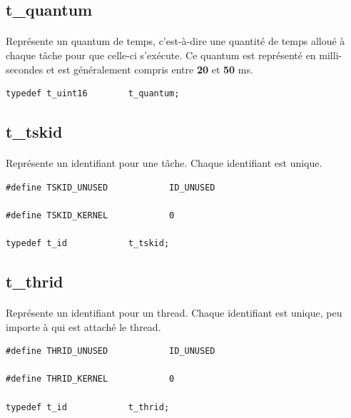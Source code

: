 \documentclass[10pt,a4wide]{article}
\begin{document}
\subsection{t\_quantum}

\paragraph{}

Repr\'esente un quantum de temps, c'est-\`a-dire une quantit\'e de temps
allou\'e \`a chaque t\^ache pour que celle-ci s'ex\'ecute. Ce quantum
est repr\'esent\'e en milli-secondes et est g\'en\'eralement compris
entre \textbf{20} et \textbf{50} ms.

\begin{verbatim}
typedef t_uint16        t_quantum;
\end{verbatim}

\subsection{t\_tskid}

\paragraph{}

Repr\'esente un identifiant pour une t\^ache. Chaque identifiant est
unique.

\begin{verbatim}
#define TSKID_UNUSED            ID_UNUSED

#define TSKID_KERNEL            0

typedef t_id            t_tskid;
\end{verbatim}

\subsection{t\_thrid}

\paragraph{}

Repr\'esente un identifiant pour un thread. Chaque identifiant est
unique, peu importe \`a qui est attach\'e le thread.

\begin{verbatim}
#define THRID_UNUSED            ID_UNUSED

#define THRID_KERNEL            0

typedef t_id            t_thrid;
\end{verbatim}
\end{document}
